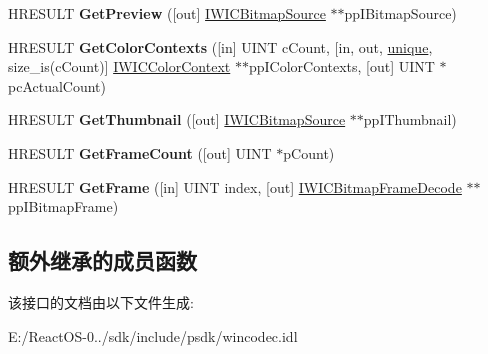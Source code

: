 \begin{DoxyCompactItemize}
\mbox{\label{interface_i_w_i_c_bitmap_decoder_a76910965c5f245be9151502d324e1907}} 
H\+R\+E\+S\+U\+LT {\bfseries Get\+Preview} (\mbox{[}out\mbox{]} \hyperlink{interface_i_w_i_c_bitmap_source}{I\+W\+I\+C\+Bitmap\+Source} $\ast$$\ast$pp\+I\+Bitmap\+Source)
\item 
\mbox{\label{interface_i_w_i_c_bitmap_decoder_a7ce54bec6dc1e8e488d130e058a33fcc}} 
H\+R\+E\+S\+U\+LT {\bfseries Get\+Color\+Contexts} (\mbox{[}in\mbox{]} U\+I\+NT c\+Count, \mbox{[}in, out, \hyperlink{interfaceunique}{unique}, size\+\_\+is(c\+Count)\mbox{]} \hyperlink{interface_i_w_i_c_color_context}{I\+W\+I\+C\+Color\+Context} $\ast$$\ast$pp\+I\+Color\+Contexts, \mbox{[}out\mbox{]} U\+I\+NT $\ast$pc\+Actual\+Count)
\item 
\mbox{\label{interface_i_w_i_c_bitmap_decoder_a67736e055accca87b2c3760f2c315ba1}} 
H\+R\+E\+S\+U\+LT {\bfseries Get\+Thumbnail} (\mbox{[}out\mbox{]} \hyperlink{interface_i_w_i_c_bitmap_source}{I\+W\+I\+C\+Bitmap\+Source} $\ast$$\ast$pp\+I\+Thumbnail)
\item 
\mbox{\label{interface_i_w_i_c_bitmap_decoder_a7c0fbd252d517877e1ece36b5e333816}} 
H\+R\+E\+S\+U\+LT {\bfseries Get\+Frame\+Count} (\mbox{[}out\mbox{]} U\+I\+NT $\ast$p\+Count)
\item 
\mbox{\label{interface_i_w_i_c_bitmap_decoder_ac95f631ce5db017256772e1ed6ba5acb}} 
H\+R\+E\+S\+U\+LT {\bfseries Get\+Frame} (\mbox{[}in\mbox{]} U\+I\+NT index, \mbox{[}out\mbox{]} \hyperlink{interface_i_w_i_c_bitmap_frame_decode}{I\+W\+I\+C\+Bitmap\+Frame\+Decode} $\ast$$\ast$pp\+I\+Bitmap\+Frame)
\end{DoxyCompactItemize}
\subsection*{额外继承的成员函数}


该接口的文档由以下文件生成\+:\begin{DoxyCompactItemize}
\item 
E\+:/\+React\+O\+S-\/0../sdk/include/psdk/wincodec.\+idl\end{DoxyCompactItemize}
